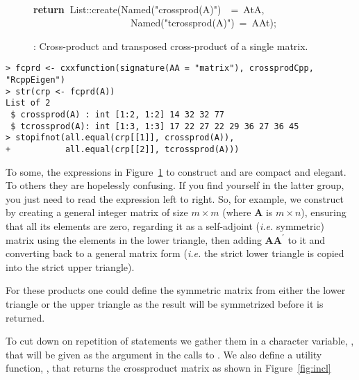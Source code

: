 \documentclass[shortnames,article,nojss]{jss}
\newcommand{\hlstd}[1]{\textcolor[rgb]{0,0,0}{#1}}
\newcommand{\hlopt}[1]{\textcolor[rgb]{0,0,0}{#1}}
\newcommand{\hlstr}[1]{\textcolor[rgb]{0.90,0.15,0.15}{#1}}
\newcommand{\hlkwa}[1]{\textcolor[rgb]{0.61,0.13,0.93}{\bf{#1}}}
\newcommand{\hlkwd}[1]{\textcolor[rgb]{0,0,0}{#1}}
\begin{document}
\begin{figure}[htb]
    \hlstd{}\hspace*{\fill}\\
    \hlkwa{return\ }\hlstd{List}\hlopt{::}\hlstd{}\hlkwd{create}\hlstd{}\hlopt{(}\hlstd{Named}\hlopt{{(}}\hlstd{}\hlstr{"crossprod(A)"}\hlstd{}\hlopt{{)}}\hlstd{\ \ }\hlopt{=\ }\hlstd{AtA}\hlopt{,}\hspace*{\fill}\\
    \hlstd{}\hlstd{\ \ \ \ \ \ \ \ \ \ \ \ \ \ \ \ \ \ \ \ }\hlstd{Named}\hlopt{{(}}\hlstd{}\hlstr{"tcrossprod(A)"}\hlstd{}\hlopt{{)}\ =\ }\hlstd{AAt}\hlopt{);}\hlstd{}\hspace*{\fill}
    \normalfont
    \normalsize
  \caption{: Cross-product and transposed cross-product of a single matrix.}
  \label{crossprod}
\end{figure}
\begin{verbatim}
> fcprd <- cxxfunction(signature(AA = "matrix"), crossprodCpp, "RcppEigen")
> str(crp <- fcprd(A))
List of 2
 $ crossprod(A) : int [1:2, 1:2] 14 32 32 77
 $ tcrossprod(A): int [1:3, 1:3] 17 22 27 22 29 36 27 36 45
> stopifnot(all.equal(crp[[1]], crossprod(A)),
+           all.equal(crp[[2]], tcrossprod(A)))
\end{verbatim}

To some, the expressions in Figure~\ref{crossprod} to construct
 and  are compact and elegant.  To others they are
hopelessly confusing.  If you find yourself in the latter group, you
just need to read the expression left to right.  So, for example, we
construct  by creating a general integer matrix of size
$m\times m$ (where $\bm A$ is $m\times n$), ensuring that all its
elements are zero, regarding it as a self-adjoint (\textit{i.e.} symmetric) matrix
using the elements in the lower triangle, then adding $\bm A\bm A^\prime$
to it and converting back to a general matrix form (\textit{i.e.} the strict lower
triangle is copied into the strict upper triangle).

For these products one could define the symmetric matrix from either
the lower triangle or the upper triangle as the result will be
symmetrized before it is returned.

To cut down on repetition of  statements we gather them in
a character variable, , that will be given as the  argument
in the calls to .  We also define a utility
function, , that returns the crossproduct matrix as shown in Figure~\ref{fig:incl}
\end{document}
